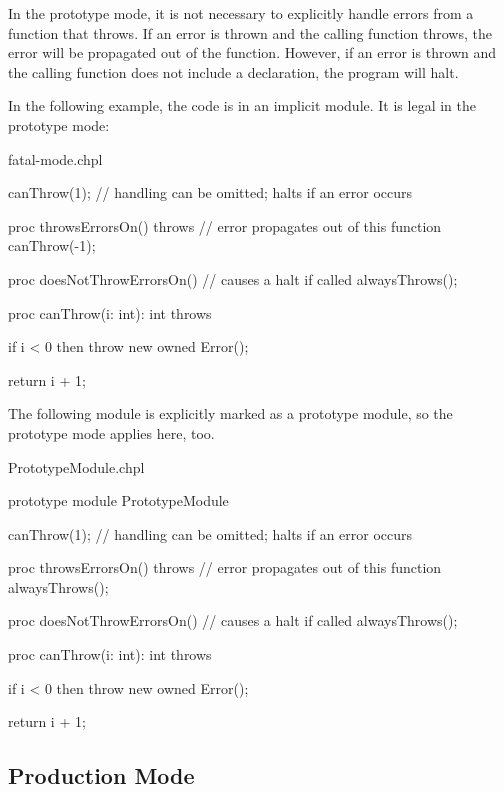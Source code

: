 In the prototype mode, it is not necessary to explicitly handle
errors from a function that throws. If an error is thrown and the calling
function throws, the error will be propagated out of the function.  However,
if an error is thrown and the calling function does not include
a  declaration, the program will halt.

In the following example, the code is in an implicit module.
It is legal in the prototype mode:

\begin{chapelexample}{fatal-mode.chpl}
\begin{chapel}
canThrow(1); // handling can be omitted; halts if an error occurs

proc throwsErrorsOn() throws {
  // error propagates out of this function
  canThrow(-1);
}

proc doesNotThrowErrorsOn() {
  // causes a halt if called
  alwaysThrows();
}
\end{chapel}
\begin{chapelpost}
proc canThrow(i: int): int throws {
  if i < 0 then
    throw new owned Error();

  return i + 1;
}
\end{chapelpost}
\end{chapelexample}

The following module is explicitly marked as a prototype module,
so the prototype mode applies here, too.

\begin{chapelexample}{PrototypeModule.chpl}
\begin{chapel}
prototype module PrototypeModule {

  canThrow(1); // handling can be omitted; halts if an error occurs

  proc throwsErrorsOn() throws {
    // error propagates out of this function
    alwaysThrows();
  }

  proc doesNotThrowErrorsOn() {
    // causes a halt if called
    alwaysThrows();
  }

  proc canThrow(i: int): int throws {
    if i < 0 then
      throw new owned Error();

    return i + 1;
  }
}
\end{chapel}
\end{chapelexample}

\subsection{Production Mode}
\label{Production_Mode_for_Explicit_Modules}

